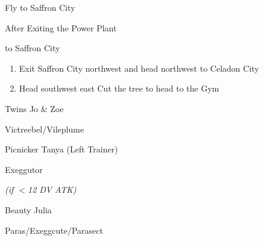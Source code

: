 \begin{paracol}{2}
\switchcolumn
\begin{story}{Fly to Saffron City}
	\varwb
	\varwe
\end{story}

\switchcolumn
\begin{menu}{After Exiting the Power Plant}
	\varwb
	\begin{pokeMenu}
		\item {} \fly{} to Saffron City \menuHlTwo{(\pointDown)}
	\end{pokeMenu}
	\varwe
\end{menu}

\begin{enumerate}[resume]
	\item Exit Saffron City northwest and head northwest to Celadon City
	\item Head southwest \pointRight{} east \pointRight{} Cut the tree to head to the Gym
\end{enumerate} 

\begin{trainer}{Twins Jo \& Zoe}
	\varwb
	\begin{fightSection}{Victreebel/Vileplume}
		\item {} \return{} 
	\end{fightSection}
	\varwe
\end{trainer}

\begin{trainer}{Picnicker Tanya (Left Trainer)}
	\varwb
	\begin{fightSection}{Exeggutor}
		\item {} \return
		\begin{notes}
			\small{\item {} \icePunch{} \textit{(if $<$12 DV ATK)}}
		\end{notes}
	\end{fightSection}
	\varwe
\end{trainer}

\begin{trainer}{Beauty Julia}
	\varwb
	\begin{fightSection}{Paras/Exeggcute/Parasect}
		\item {} \strength{} 
	\end{fightSection}
	\varwe
\end{trainer}


\end{paracol}
